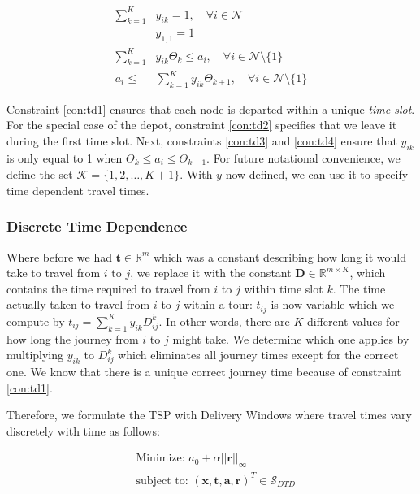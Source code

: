 \begin{align}
\sum \limits_{k = 1}^K &y_{ik} = 1, \quad \forall i \in \mathcal{N} \label{con:td1}\\
&y_{1,1}=1 \label{con:td2}\\
\sum \limits_{k=1}^K &y_{ik}\Theta_k \leq a_i, \quad \forall i \in \mathcal{N}\setminus \{1\}\label{con:td3}\\
a_i \leq &\sum \limits_{k=1}^K y_{ik}\Theta_{k+1}  , \quad \forall i \in \mathcal{N}\setminus \{1\}\label{con:td4}
\end{align}

Constraint \ref{con:td1} ensures that each node is departed within a unique \textit{time slot}. For the special case of the depot, constraint \ref{con:td2} specifies that we leave it during the first time slot. Next, constraints \ref{con:td3} and \ref{con:td4} ensure that $y_{ik}$ is only equal to 1 when $\Theta_k \leq a_i \leq \Theta_{k+1}$. For future notational convenience, we define the set $\mathcal{K} = \{1, 2, \ldots, K+1\}$.  With $y$ now defined, we can use it to specify time dependent travel times. 

\subsubsection{Discrete Time Dependence}
\label{sec:piece_const_travel}

Where before we had $\mathbf{t} \in \mathbb{R}^m$ which was a constant describing how long it would take to travel from $i$ to $j$, we replace it with the constant $\mathbf{D} \in \mathbb{R}^{m \times K}$, which contains the time required to travel from $i$ to $j$ within time slot $k$. The time actually taken to travel from $i$ to $j$ within a tour: $t_{ij}$ is now variable which we compute by $t_{ij} = \sum \limits_{k = 1}^K y_{ik} D^k_{ij}$. In other words, there are $K$ different values for how long the journey from $i$ to $j$ might take. We determine which one applies by multiplying $y_{ik}$ to $D^k_{ij}$ which eliminates all journey times except for the correct one. We know that there is a unique correct journey time because of constraint \ref{con:td1}.

Therefore, we formulate the TSP with Delivery Windows where travel times vary discretely with time as follows:

\begin{align}
&\text{Minimize: } a_0 + \alpha ||\mathbf{r}||_\infty\\
&\text{subject to: } (\mathbf{x}, \mathbf{t}, \mathbf{a}, \mathbf{r})^T \in \mathcal{S}_{DTD}\nonumber
\end{align}

